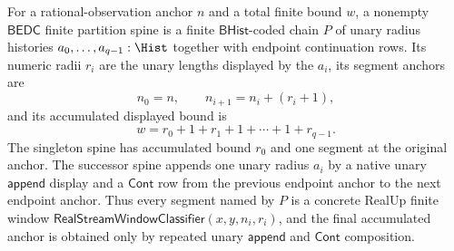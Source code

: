 \begin{definition}
\label{def:real-stream-window-partition-spine}
For a rational-observation anchor $n$ and a total finite bound $w$, a nonempty
$\mathsf{BEDC}$ finite partition spine is a finite $\mathsf{BHist}$-coded chain
$P$ of unary radius histories $a_0,\ldots,a_{q-1}:\Hist$ together with endpoint
continuation rows. Its numeric radii $r_i$ are the unary lengths displayed by
the $a_i$, its segment anchors are
$$
n_0=n,\qquad n_{i+1}=n_i+(r_i+1),
$$
and its accumulated displayed bound is
$$
w=r_0+1+r_1+1+\cdots+1+r_{q-1}.
$$
The singleton spine has accumulated bound $r_0$ and one segment at the original
anchor. The successor spine appends one unary radius $a_i$ by a native unary
$\mathsf{append}$ display and a $\mathsf{Cont}$ row from the previous endpoint
anchor to the next endpoint anchor. Thus every segment named by $P$ is a
concrete RealUp finite window
$\mathsf{RealStreamWindowClassifier}(x,y,n_i,r_i)$, and the final accumulated
anchor is obtained only by repeated unary $\mathsf{append}$ and $\mathsf{Cont}$
composition.
\end{definition}

